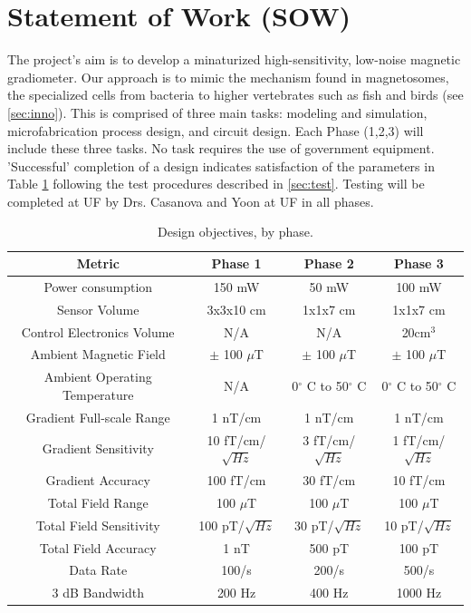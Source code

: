 

\section{Statement of Work (SOW)}
The project's aim is to develop a minaturized high-sensitivity, low-noise magnetic gradiometer. Our approach is to mimic the mechanism found in magnetosomes, the specialized cells from bacteria to higher vertebrates such as fish and birds (see \ref{sec:inno}). This is comprised of three main tasks: modeling and simulation, microfabrication process design, and circuit design. Each Phase (1,2,3) will include these three tasks. No task requires the use of government equipment. 'Successful' completion of a design indicates satisfaction of the parameters in Table \ref{table:obj} following the test procedures described in \ref{sec:test}. Testing will be completed at UF by Drs. Casanova and Yoon at UF in all phases.

\begin{table}[h!]
\centering
  \begin{tabular}{|c||c|c|c|}
    \hline
    Metric & Phase 1 & Phase 2 & Phase 3 \\
    \hline
    \hline
    Power consumption & 150 mW & 50 mW & 100 mW \\
    \hline
    Sensor Volume & 3x3x10 cm & 1x1x7 cm & 1x1x7 cm \\
    \hline
    Control Electronics Volume  & N/A & N/A & 20cm$^3$ \\
    \hline
    Ambient Magnetic Field & $\pm$ 100 $\mu$T & $\pm$ 100 $\mu$T & $\pm$ 100 $\mu$T \\
    \hline
    Ambient Operating Temperature & N/A & 0$^{\circ}$ C to 50$^{\circ}$ C & 0$^{\circ}$ C to 50$^{\circ}$ C \\
    \hline
    Gradient Full-scale Range & 1 nT/cm & 1 nT/cm & 1 nT/cm \\
    \hline
    Gradient Sensitivity & 10 fT/cm/$\sqrt{Hz}$ & 3 fT/cm/$\sqrt{Hz}$  & 1 fT/cm/$\sqrt{Hz}$ \\
    \hline
    Gradient Accuracy & 100 fT/cm & 30 fT/cm & 10 fT/cm \\
    \hline
    Total Field Range & 100 $\mu$T & 100 $\mu$T & 100 $\mu$T \\
    \hline
    Total Field Sensitivity & 100 pT/$\sqrt{Hz}$ & 30 pT/$\sqrt{Hz}$  &  10 pT/$\sqrt{Hz}$ \\
    \hline
    Total Field Accuracy & 1 nT & 500 pT & 100 pT \\
    \hline
    Data Rate & 100/s & 200/s & 500/s \\
    \hline
    3 dB Bandwidth & 200 Hz & 400 Hz & 1000 Hz\\
    \hline
  \end{tabular}
\caption{Design objectives, by phase.}
\label{table:obj}
\end{table}


